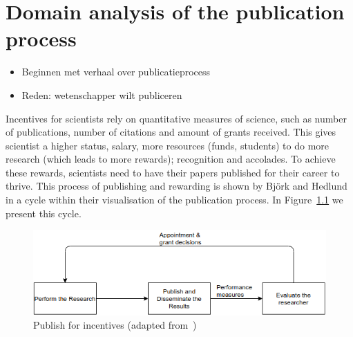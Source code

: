 \documentclass{ou-report}
\newcommand{\outline}[1]{{\color{blue} #1}}
\begin{document}
    






\chapter{Domain analysis of the publication process}
\outline{
\begin{itemize}
    \item Beginnen met verhaal over publicatieprocess
    \item Reden: wetenschapper wilt publiceren
\end{itemize}
}

Incentives for scientists rely on quantitative measures of science, such as 
number of publications, number of citations and amount of grants received. This 
gives scientist a higher status, salary, more resources (funds, students) to do 
more research (which leads to more rewards); recognition and accolades. To 
achieve these rewards, scientists need to have their papers published for their 
career to thrive. This process of publishing and rewarding is shown by Bj\"ork 
and Hedlund~\cite{BH2004} in a cycle within their visualisation of the 
publication process. In Figure~\ref{fig:publish_incentives} we present this 
cycle.

\begin{figure}[H]
\centering
\includegraphics[width=12cm]{images/publication_process.drawio.png}
\caption{Publish for incentives (adapted from~\cite{BH2004})}
\label{fig:publish_incentives}
\end{figure}
\end{document}
